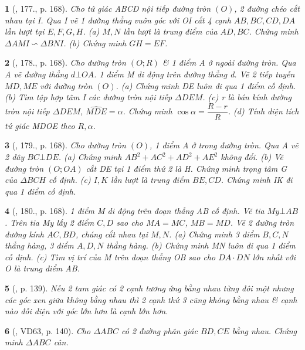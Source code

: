 \documentclass{article}
\newtheorem{baitoan}{}
\begin{document}
\begin{baitoan}[\cite{Tuyen_Toan_9_old}, 177., p. 168]
	Cho tứ giác ABCD nội tiếp đường tròn $(O)$, 2 đường chéo cắt nhau tại I. Qua I vẽ 1 đường thẳng vuôn góc với OI cắt 4 cạnh $AB,BC,CD,DA$ lần lượt tại $E,F,G,H$. (a) $M,N$ lần lượt là trung điểm của $AD,BC$. Chứng minh $\Delta AMI\backsim\Delta BNI$. (b) Chứng minh $GH = EF$.
\end{baitoan}

\begin{baitoan}[\cite{Tuyen_Toan_9_old}, 178., p. 168]
	Cho đường tròn $(O;R)$ \& 1 điểm A ở ngoài đường tròn. Qua A vẽ đường thẳng $d\bot OA$. 1 điểm M di động trên đường thẳng d. Vẽ 2 tiếp tuyến $MD,ME$ với đường tròn $(O)$. (a) Chứng minh DE luôn đi qua 1 điểm cố định. (b) Tìm tập hợp tâm I các đường tròn nội tiếp $\Delta DEM$. (c) r là bán kính đường tròn nội tiếp $\Delta DEM$, $\widehat{MDE} = \alpha$. Chứng minh $\cos\alpha = \dfrac{R - r}{R}$. (d) Tính diện tích tứ giác MDOE theo $R,\alpha$.
\end{baitoan}

\begin{baitoan}[\cite{Tuyen_Toan_9_old}, 179., p. 168]
	Cho đường tròn $(O)$, 1 điểm A ở trong đường tròn. Qua A vẽ 2 dây $BC\bot DE$. (a) Chứng minh $AB^2 + AC^2 + AD^2 + AE^2$ không đổi. (b) Vẽ đường tròn $(O;OA)$ cắt DE tại 1 điểm thứ 2 là H. Chứng minh trọng tâm G của $\Delta BCH$ cố định. (c) $I,K$ lần lượt là trung điểm $BE,CD$. Chứng minh IK đi qua 1 điểm cố định.
\end{baitoan}

\begin{baitoan}[\cite{Tuyen_Toan_9_old}, 180., p. 168]
	1 điểm M di động trên đoạn thẳng AB cố định. Vẽ tia $My\bot AB$. Trên tia My lấy 2 điểm $C,D$ sao cho $MA = MC$, $MB = MD$. Vẽ 2 đường tròn đường kính $AC,BD$, chúng cắt nhau tại $M,N$. (a) Chứng minh 3 điểm $B,C,N$ thẳng hàng, 3 điểm $A,D,N$ thẳng hàng. (b) Chứng minh MN luôn đi qua 1 điểm cố định. (c) Tìm vị trí của M trên đoạn thẳng OB sao cho $DA\cdot DN$ lớn nhất với O là trung điểm AB.
\end{baitoan}

\begin{baitoan}[\cite{Binh_Toan_9_tap_2}, p. 139]
	Nếu 2 tam giác có 2 cạnh tương ứng bằng nhau từng đôi một nhưng các góc xen giữa không bằng nhau thì 2 cạnh thứ 3 cũng không bằng nhau \& cạnh nào đối diện với góc lớn hơn là cạnh lớn hơn.
\end{baitoan}

\begin{baitoan}[\cite{Binh_Toan_9_tap_2}, VD63, p. 140]
	Cho $\Delta ABC$ có 2 đường phân giác $BD,CE$ bằng nhau. Chứng minh $\Delta ABC$ cân.
\end{baitoan}
\end{document}
